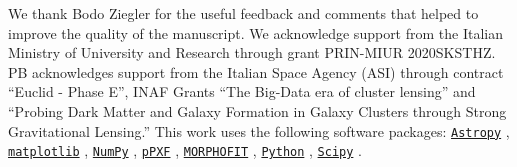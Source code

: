 \documentclass{aa}
\begin{document}
\begin{acknowledgements}
We thank Bodo Ziegler for the useful feedback and comments that helped to improve the quality of the manuscript. We acknowledge support from the Italian Ministry of University and Research through grant PRIN-MIUR 2020SKSTHZ. PB acknowledges support from the Italian Space Agency (ASI) through contract ``Euclid - Phase E'', INAF Grants ``The Big-Data era of cluster lensing'' and ``Probing Dark Matter and Galaxy Formation in Galaxy Clusters through Strong Gravitational Lensing.''
This work uses the following software packages:
\href{https://github.com/astropy/astropy}{\texttt{Astropy}}
\citep{astropy1, astropy2},
\href{https://github.com/matplotlib/matplotlib}{\texttt{matplotlib}}
\citep{matplotlib},
\href{https://github.com/numpy/numpy}{\texttt{NumPy}}
\citep{numpy1, numpy2},
\href{https://pypi.org/project/ppxf/}{\texttt{pPXF}}
\citep{cappellari04,cappellari23},
\href{https://github.com/torluca/morphofit}{\texttt{MORPHOFIT}}
\citep{tortorellimercurio,tortorelli23},
\href{https://www.python.org/}{\texttt{Python}}
\citep{python},
\href{https://github.com/scipy/scipy}{\texttt{Scipy}}
\citep{scipy}.
\end{acknowledgements}
\end{document}
